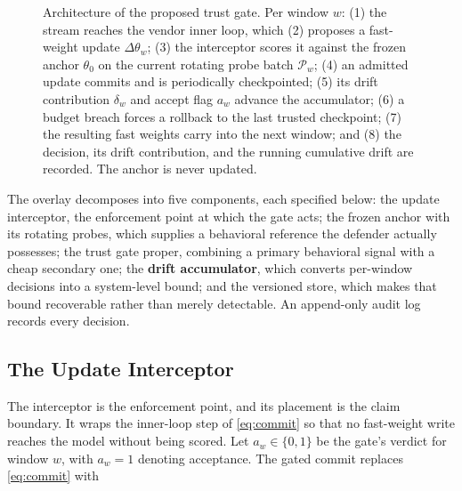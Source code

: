 \documentclass[journal]{IEEEtran}
\newcommand{\anchorp}{\theta_{0}}
\newcommand{\dtheta}{\Delta\theta}
\begin{document}
\begin{figure}[!t]
\caption{Architecture of the proposed trust gate. Per window $w$: (1) the stream
reaches the vendor inner loop, which (2) proposes a fast-weight update $\dtheta_w$;
(3) the interceptor scores it against the frozen anchor $\anchorp$ on the current
rotating probe batch $\mathcal{P}_w$; (4) an admitted update commits and is
periodically checkpointed; (5) its drift contribution $\delta_w$ and accept flag
$a_w$ advance the accumulator; (6) a budget breach forces a rollback to the last
trusted checkpoint; (7) the resulting fast weights carry into the next window; and
(8) the decision, its drift contribution, and the running cumulative drift are
recorded. The anchor is never updated.}
\label{fig:arch}
\end{figure}

The overlay decomposes into five components, each specified below: the
update interceptor, the enforcement point at which the gate acts; the
frozen anchor with its rotating probes, which supplies a behavioral
reference the defender actually possesses; the trust gate proper, combining
a primary behavioral signal with a cheap secondary one; the \textbf{drift
accumulator}, which converts per-window decisions into a system-level bound; and the
versioned store, which makes that bound recoverable rather than merely
detectable. An append-only audit log records every decision.

\subsection{The Update Interceptor}
\label{sec:interceptor}

The interceptor is the enforcement point, and its placement is the claim boundary.
It wraps the inner-loop step of \eqref{eq:commit} so that no fast-weight write
reaches the model without being scored. Let $a_w \in \{0,1\}$ be the gate's verdict
for window $w$, with $a_w = 1$ denoting acceptance. The gated commit replaces
\eqref{eq:commit} with
\end{document}
